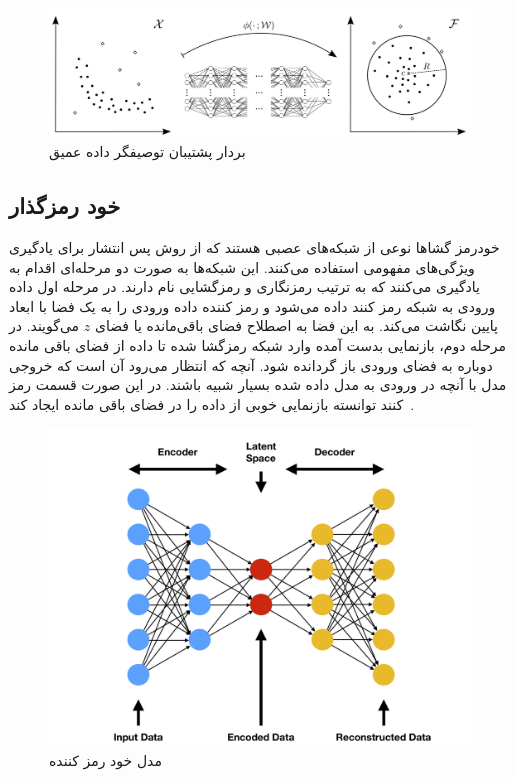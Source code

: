 \documentclass[12pt,a4paper]{report}
\theoremstyle{definition}
\theoremstyle{definition}
\begin{document}
\begin{figure}[!h]
	\begin{center}
		\includegraphics[width=\linewidth]{./images/figures/deep-svdd.png}
	\end{center}
	\caption{بردار پشتیبان توصیفگر داده عمیق~\cite{pmlr-v80-ruff18a}}
	\label{fig:deep-svdd}
	\centering
\end{figure}

	\subsection{خود رمزگذار}
	خودرمز گشا‌ها نوعی از شبکه‌های عصبی هستند که از روش پس انتشار برای یادگیری ویژگی‌های مفهومی استفاده می‌کنند. این شبکه‌ها به صورت دو مرحله‌ای اقدام به یادگیری می‌کنند که به ترتیب رمزنگاری و رمزگشایی نام دارند. در مرحله اول داده ورودی به شبکه رمز کنند داده می‌شود و رمز کننده داده ورودی را به یک فضا با ابعاد پایین نگاشت می‌کند. به این فضا به اصطلاح فضای باقی‌مانده یا فضای $z$ می‌گویند. در مرحله دوم، بازنمایی بدست آمده وارد شبکه رمزگشا شده تا داده از فضای باقی مانده دوباره به فضای ورودی باز گردانده شود. آنچه که انتظار می‌رود آن است که خروجی مدل با آنچه در ورودی به مدل داده شده بسیار شبیه باشند. در این صورت قسمت رمز کنند توانسته بازنمایی خوبی از داده را در فضای باقی مانده ایجاد کند~\cite{BHUVANESHWARI2021131}.
\begin{figure}[!h]
	\begin{center}
		\includegraphics[width=0.6\linewidth]{./images/figures/ae.png}
	\end{center}
	\caption{مدل خود رمز کننده}
	\label{fig:ae}
	\centering
\end{figure}
\end{document}
